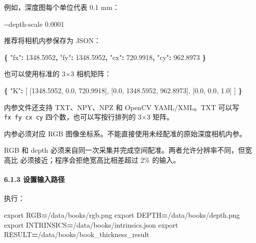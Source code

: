 \documentclass[
  chinese,
  11pt,
  a4paper,
]{article}
\newenvironment{Shaded}{\begin{snugshade}}{\end{snugshade}}
\newcommand{\BuiltInTok}[1]{#1}
\newcommand{\DataTypeTok}[1]{\textcolor[rgb]{0.13,0.29,0.53}{#1}}
\newcommand{\ExtensionTok}[1]{#1}
\newcommand{\FloatTok}[1]{\textcolor[rgb]{0.00,0.00,0.81}{#1}}
\newcommand{\FunctionTok}[1]{\textcolor[rgb]{0.13,0.29,0.53}{\textbf{#1}}}
\newcommand{\NormalTok}[1]{#1}
\newcommand{\OperatorTok}[1]{\textcolor[rgb]{0.81,0.36,0.00}{\textbf{#1}}}
\newcommand{\OtherTok}[1]{\textcolor[rgb]{0.56,0.35,0.01}{#1}}
\newcommand{\VariableTok}[1]{\textcolor[rgb]{0.00,0.00,0.00}{#1}}
\begin{document}
例如，深度图每个单位代表 0.1 mm：

\begin{Shaded}
\begin{Highlighting}[]
\ExtensionTok{{-}{-}depth{-}scale}\NormalTok{ 0.0001}
\end{Highlighting}
\end{Shaded}

推荐将相机内参保存为 JSON：

\begin{Shaded}
\begin{Highlighting}[]
\FunctionTok{\{}
  \DataTypeTok{"fx"}\FunctionTok{:} \FloatTok{1348.5952}\FunctionTok{,}
  \DataTypeTok{"fy"}\FunctionTok{:} \FloatTok{1348.5952}\FunctionTok{,}
  \DataTypeTok{"cx"}\FunctionTok{:} \FloatTok{720.9918}\FunctionTok{,}
  \DataTypeTok{"cy"}\FunctionTok{:} \FloatTok{962.8973}
\FunctionTok{\}}
\end{Highlighting}
\end{Shaded}

也可以使用标准的 3×3 相机矩阵：

\begin{Shaded}
\begin{Highlighting}[]
\FunctionTok{\{}
  \DataTypeTok{"K"}\FunctionTok{:} \OtherTok{[}
    \OtherTok{[}\FloatTok{1348.5952}\OtherTok{,} \FloatTok{0.0}\OtherTok{,} \FloatTok{720.9918}\OtherTok{],}
    \OtherTok{[}\FloatTok{0.0}\OtherTok{,} \FloatTok{1348.5952}\OtherTok{,} \FloatTok{962.8973}\OtherTok{],}
    \OtherTok{[}\FloatTok{0.0}\OtherTok{,} \FloatTok{0.0}\OtherTok{,} \FloatTok{1.0}\OtherTok{]}
  \OtherTok{]}
\FunctionTok{\}}
\end{Highlighting}
\end{Shaded}

内参文件还支持 TXT、NPY、NPZ 和 OpenCV YAML/XML。TXT 可以写
\texttt{fx\ fy\ cx\ cy} 四个数，也可以写按行排列的 3×3 矩阵。

内参必须对应 RGB 图像坐标系。不能直接使用未经配准的原始深度相机内参。

RGB 和 depth
必须来自同一次采集并完成空间配准。两者允许分辨率不同，但宽高比
必须接近；程序会拒绝宽高比相差超过 2\% 的输入。

\paragraph{6.1.3
设置输入路径}\label{613-ux8bbeux7f6eux8f93ux5165ux8defux5f84}

执行：

\begin{Shaded}
\begin{Highlighting}[]
\BuiltInTok{export} \VariableTok{RGB}\OperatorTok{=}\NormalTok{/data/books/rgb.png}
\BuiltInTok{export} \VariableTok{DEPTH}\OperatorTok{=}\NormalTok{/data/books/depth.png}
\BuiltInTok{export} \VariableTok{INTRINSICS}\OperatorTok{=}\NormalTok{/data/books/intrinsics.json}
\BuiltInTok{export} \VariableTok{RESULT}\OperatorTok{=}\NormalTok{/data/books/book\_thickness\_result}
\end{Highlighting}
\end{Shaded}
\end{document}
